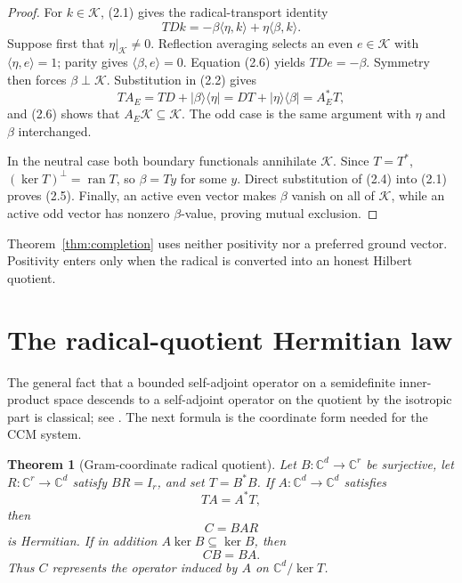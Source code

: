 \documentclass[11pt]{article}
\newtheorem{theorem}{Theorem}[section]
\numberwithin{equation}{section}
\theoremstyle{definition}
\theoremstyle{remark}
\newcommand{\C}{\mathbb C}
\newcommand{\K}{\mathcal K}
\newcommand{\ran}{\operatorname{ran}}
\newcommand{\kerop}{\operatorname{ker}}
\begin{document}
\begin{proof}
For $k\in\K$, (2.1) gives the radical-transport identity
\begin{equation}
 TDk=-\beta\langle\eta,k\rangle
       +\eta\langle\beta,k\rangle.
\end{equation}
Suppose first that $\eta|_{\K}\ne0$.  Reflection averaging selects an even $e\in\K$ with
$\langle\eta,e\rangle=1$; parity gives $\langle\beta,e\rangle=0$.  Equation (2.6) yields
$TDe=-\beta$.  Symmetry then forces $\beta\perp\K$.  Substitution in (2.2) gives
\[
 TA_E=TD+|\beta\rangle\langle\eta|
     =DT+|\eta\rangle\langle\beta|=A_E^*T,
\]
and (2.6) shows that $A_E\K\subseteq\K$.  The odd case is the same argument with
$\eta$ and $\beta$ interchanged.

In the neutral case both boundary functionals annihilate $\K$.  Since $T=T^*$,
$(\kerop T)^\perp=\ran T$, so $\beta=Ty$ for some $y$.  Direct substitution of (2.4) into
(2.1) proves (2.5).  Finally, an active even vector makes $\beta$ vanish on all of $\K$, while an
active odd vector has nonzero $\beta$-value, proving mutual exclusion.
\end{proof}

Theorem~\ref{thm:completion} uses neither positivity nor a preferred ground vector.  Positivity
enters only when the radical is converted into an honest Hilbert quotient.

\section{The radical-quotient Hermitian law}

The general fact that a bounded self-adjoint operator on a semidefinite inner-product space
descends to a self-adjoint operator on the quotient by the isotropic part is classical; see
\cite{Bovdi2020}.  The next formula is the coordinate form needed for the CCM system.

\begin{theorem}[Gram-coordinate radical quotient]
\label{thm:gram}
Let $B:\C^d\to\C^r$ be surjective, let $R:\C^r\to\C^d$ satisfy $BR=I_r$, and set
$T=B^*B$.  If $A:\C^d\to\C^d$ satisfies
\begin{equation}
                         TA=A^*T,
\end{equation}
then
\begin{equation}
                         C=BAR
\end{equation}
is Hermitian.  If in addition $A\kerop B\subseteq\kerop B$, then
\begin{equation}
                         CB=BA.
\end{equation}
Thus $C$ represents the operator induced by $A$ on $\C^d/\kerop T$.
\end{theorem}
\end{document}
